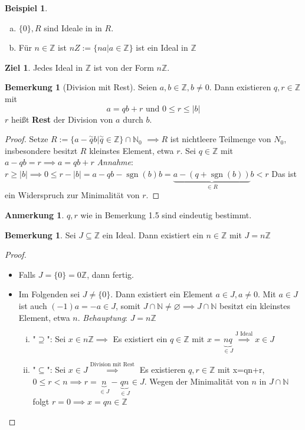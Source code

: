 \documentclass[a4paper, titlepage]{article}
\theoremstyle{definition}
\newtheorem{bsp}[satz]{Beispiel}
\newtheorem{bem}[satz]{Bemerkung}
\newtheorem*{anm}{Anmerkung}
\newtheorem*{ziel}{Ziel}
\newcommand{\N}{\mathbb{N}}
\newcommand{\Z}{\mathbb{Z}}
\begin{document}
\begin{bsp}
	\begin{enumerate}[(a)]
		\item $\{0\}, R$ sind Ideale in in $R$.
		\item  Für $n \in \Z$ ist $nZ:=\{na|a\in \Z\}$ ist ein Ideal in $\Z$
	\end{enumerate}
\end{bsp}
\begin{ziel}
Jedes Ideal in $\Z$ ist von der Form  $n\Z$.
\end{ziel}
\begin{bem}[Division mit Rest]
	Seien $a,b\in\Z,b\neq 0$. Dann existieren $q,r\in\Z$ mit 
	$$a=qb+r \text{ und } 0\leq r\leq |b|$$
	$r$ heißt \textbf{Rest} der Division von $a$ durch $b$.
\end{bem}
\begin{proof}
	Setze $R:=\{a-\overset{\sim}{q}b|\overset{\sim}{q}\in\Z\}\cap \N_0$
	$\implies R$ ist nichtleere Teilmenge von $N_0$, insbesondere besitzt $R$ kleinstes Element, etwa $r$.
	Sei $q\in\Z$ mit $a-qb=r \implies a=qb+r$
	\textit{Annahme}: $r\geq |b|\implies 0\leq r-|b|=a-qb-\operatorname{sgn}(b)b=\underbrace{a-(q+\operatorname{sgn}(b))}_{\in R}b<r$ Das ist ein Widerspruch zur Minimalität von $r$.
\end{proof}
\begin{anm}
 $q,r$ wie in Bemerkung 1.5 sind eindeutig bestimmt.
\end{anm}
\begin{bem}
	Sei $J \subseteq \Z$ ein Ideal. Dann existiert ein $n\in\Z$ mit  $J=n\Z$
\end{bem}
\begin{proof}
	\begin{itemize}
	\item Falls $J=\{0\}=0\Z$, dann fertig.
	\item Im Folgenden sei $J\neq \{0\}$. Dann existiert ein Element $a\in J, a\neq 0$. Mit $a\in J$ ist auch $(-1)a=-a\in J$, somit $J \cap \N\neq \varnothing \implies  J\cap\N$ besitzt ein kleinstes Element, etwa $n$.
	\textit{Behauptung}: $J=n\Z$
		\begin{enumerate}[(i)]
			\item "$\supseteq$": Sei $x\in n\Z \implies $ Es existiert ein $q\in \Z$ mit $x=\underbrace{nq}_{\in J}\overset{\text{J Ideal}}{\implies}x\in J$
			\item "$\subseteq$": Sei $x\in J \overset{\text{Division mit Rest}}{\implies}$ Es existieren $q,r \in \Z$ mit x=qn+r, $0\leq r < n \implies r = \underbrace{n}_{\in J}-\underbrace{qn}_{\in J}\in J$. Wegen der Minimalität von  $n$ in $J \cap \N$ folgt $r=0 \implies x=qn\in \Z$
		\end{enumerate}
	\end{itemize}
\end{proof}
\end{document}
